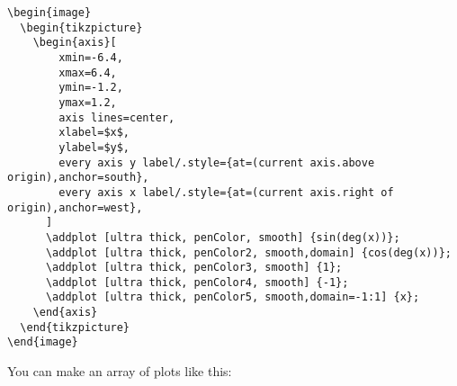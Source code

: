 \documentclass{ximera}
\begin{document}
\begin{verbatim}
\begin{image}
  \begin{tikzpicture}
    \begin{axis}[
        xmin=-6.4,
        xmax=6.4,
        ymin=-1.2,
        ymax=1.2,
        axis lines=center,
        xlabel=$x$,
        ylabel=$y$,
        every axis y label/.style={at=(current axis.above origin),anchor=south},
        every axis x label/.style={at=(current axis.right of origin),anchor=west},
      ]
      \addplot [ultra thick, penColor, smooth] {sin(deg(x))};
      \addplot [ultra thick, penColor2, smooth,domain] {cos(deg(x))};
      \addplot [ultra thick, penColor3, smooth] {1};
      \addplot [ultra thick, penColor4, smooth] {-1};
      \addplot [ultra thick, penColor5, smooth,domain=-1:1] {x};
    \end{axis}
  \end{tikzpicture}
\end{image}
\end{verbatim}

You can make an array of plots like this:
\end{document}
